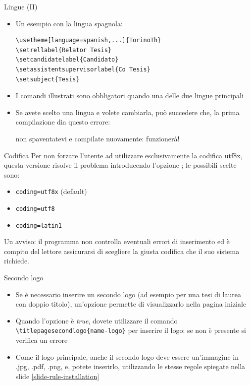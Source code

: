 \begin{frame}[t,fragile]{Lingue (II)}
\begin{itemize}
\item Un esempio con la lingua spagnola:
\begin{verbatim}
\usetheme[language=spanish,...]{TorinoTh}
\setrellabel{Relator Tesis}
\setcandidatelabel{Candidato}
\setassistentsupervisorlabel{Co Tesis}
\setsubject{Tesis}
\end{verbatim}
\item I comandi illustrati sono obbligatori quando  una delle due lingue principali
\item Se avete scelto una lingua e volete cambiarla, può succedere che, la prima compilazione dia questo errore: \begin{flushleft}
\end{flushleft}
non spaventatevi e compilate nuovamente: funzionerà!
\end{itemize}
\end{frame}
\begin{frame}[t,fragile]{Codifica}
Per non forzare l'utente ad utilizzare esclusivamente la codifica utf8x, questa versione risolve il problema introducendo l'opzione ; le possibili scelte sono:
\begin{itemize}
\item \verb!coding=utf8x! (default)
\item \verb!coding=utf8!
\item \verb!coding=latin1!
\end{itemize}
Un avviso: il programma non controlla eventuali errori di inserimento ed è compito del lettore assicurarsi di scegliere la giusta codifica che il suo sistema richiede.
\end{frame}
\begin{frame}[t,fragile]{Secondo logo}
\begin{itemize}
\item Se è necessario inserire un secondo logo (ad esempio per una tesi di laurea con doppio titolo), un'opzione permette di visualizzarlo nella pagina iniziale
\item Quando l'opzione  è \emph{true}, dovete utilizzare il comando \verb!\titlepagesecondlogo{name-logo}! per inserire il logo: se non è presente si verifica un errore
\item Come il logo principale, anche il secondo logo deve essere un'immagine in .jpg, .pdf, .png, e, potete inserirlo, utilizzando le stesse regole spiegate nella slide \ref{slide-rule-installation}
\end{itemize}
\end{frame}

